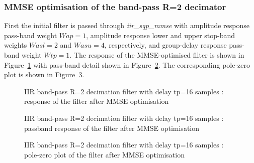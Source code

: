 \documentclass[a4paper,twoside,10pt,english]{report}
\begin{document}
\subsubsection{\label{sub:MMSE-optimisation-of-the-band-pass-R2-decimator}MMSE optimisation of the band-pass  R=2 decimator}
First the initial filter is passed through \emph{iir\_sqp\_mmse} with amplitude
response pass-band weight $Wap=1$, amplitude response lower and 
upper stop-band weights $Wasl=2$ and $Wasu=4$, respectively, and
group-delay response pass-band weight $Wtp=1$. The 
response of the MMSE-optimised filter is shown in 
Figure~\ref{fig:iir-sqp-slb-bandpass-test-mmse-x1} with pass-band detail
shown in Figure~\ref{fig:iir-sqp-slb-bandpass-test-mmse-x1-passband}. The 
corresponding pole-zero plot is shown in 
Figure~\ref{fig:iir-sqp-slb-bandpass-test-mmse-x1-pz}. 
\begin{figure}[!htbp]
\begin{center}
\scalebox{0.7}{}
\caption{IIR band-pass R=2 decimation filter with delay tp=16 samples : response of the filter after MMSE optimisation}
\label{fig:iir-sqp-slb-bandpass-test-mmse-x1}
\end{center}
\end{figure}
\begin{figure}[!htbp]
\begin{center}
\scalebox{0.7}{}
\caption{IIR band-pass R=2 decimation filter with delay tp=16 samples : passband response of the filter after MMSE optimisation}
\label{fig:iir-sqp-slb-bandpass-test-mmse-x1-passband}
\end{center}
\end{figure}
\begin{figure}[!htbp]
\begin{center}
\scalebox{0.7}{}
\caption{IIR band-pass R=2 decimation filter with delay tp=16 samples : pole-zero plot of the filter after MMSE optimisation}
\label{fig:iir-sqp-slb-bandpass-test-mmse-x1-pz}
\end{center}
\end{figure}
\clearpage
\end{document}
